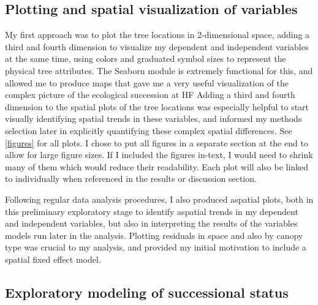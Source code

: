 \documentclass[12pt,a4paper]{article}
\begin{document}
\subsection{Plotting and spatial visualization of variables}

My first approach was to plot the tree locations in 2-dimensional space, adding a third and fourth dimension to visualize my dependent and independent variables at the same time, using colors and graduated symbol sizes to represent the physical tree attributes.  The Seaborn module is extremely functional for this, and allowed me to produce maps that gave me a very useful visualization of the complex picture of the ecological succession at HF  Adding a third and fourth dimension to the spatial plots of the tree locations was especially helpful to start visually identifying spatial trends in these variables, and informed my methods selection later in explicitly quantifying these complex spatial differences.  See \cref{figures} for all plots.  I chose to put all figures in a separate section at the end to allow for large figure sizes.  If I included the figures in-text, I would need to shrink many of them which would reduce their readability.  Each plot will also be linked to individually when referenced in the results or discussion section.  

Following regular data analysis procedures, I also produced aspatial plots, both in this preliminary exploratory stage to identify aspatial trends in my dependent and independent variables, but also in interpreting the results of the variables models run later in the analysis.  Plotting residuals in space and also by canopy type was crucial to my analysis, and provided my initial motivation to include a spatial fixed effect model. 

\subsection{Exploratory modeling of successional status}
\end{document}
